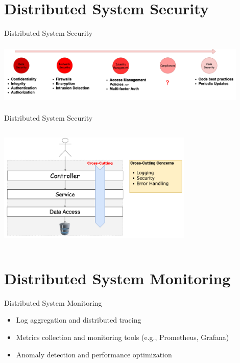 \documentclass{beamer}
\begin{document}
\section{Distributed System Security}
\begin{frame}{Distributed System Security}
  \begin{center}
   	 		\includegraphics[width=0.9\textwidth, height=30mm, scale=1]{img/security.PNG}
  \end{center}
\end{frame}


\begin{frame}{Distributed System Security}
		\begin{center}
   	 		\includegraphics[width=0.7\textwidth, height=60mm, scale=1]{img/cross-cutting.png}
  		\end{center}
\end{frame}

\section{Distributed System Monitoring}
\begin{frame}{Distributed System Monitoring}
  \begin{itemize}
    \item Log aggregation and distributed tracing
    \item Metrics collection and monitoring tools (e.g., Prometheus, Grafana)
    \item Anomaly detection and performance optimization
  \end{itemize}
\end{frame}
\end{document}
